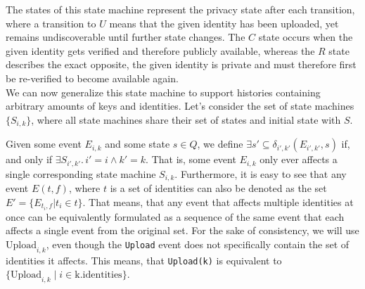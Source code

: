 The states of this state machine represent the privacy state after each transition, where a transition to \(U\) means that the given identity has been uploaded, yet remains undiscoverable until further state changes. The \(C\) state occurs when the given identity gets verified and therefore publicly available, whereas the \(R\) state describes the exact opposite, the given identity is private and must therefore first be re-verified to become available again.
\\

We can now generalize this state machine to support histories containing arbitrary amounts of keys and identities. Let's consider the set of state machines \(\{S_{i,k}\}\), where all state machines share their set of states and initial state with \(S\). 

Given some event \(E_{i,k}\) and some state \(s \in Q\), we define \( \exists {s'} \subseteq \delta_{i',k'}(E_{i',k'},s) \) if, and only if \( \exists S_{i',k'} .\, i' = i \wedge k' = k\). That is, some event \(E_{i,k}\) only ever affects a single corresponding state machine \(S_{i,k}\).
Furthermore, it is easy to see that any event \(E(t,f)\), where \(t\) is a set of identities can also be denoted as the set \(E' = \{E_{t_i,f} | t_i \in t\} \). That means, that any event that affects multiple identities at once can be equivalently formulated as a sequence of the same event that each affects a single event from the original set.
For the sake of consistency, we will use \(\text{Upload}_{i,k}\), even though the \texttt{Upload} event does not specifically contain the set of identities it affects. This means, that \texttt{Upload(k)} is equivalent to \(\{\text{Upload}_{i,k} \; \big|\; i \in \text{k.identities}\}\).

